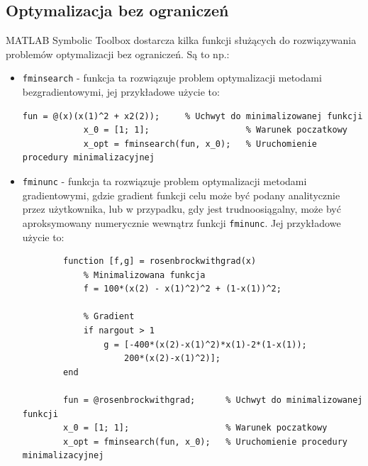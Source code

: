\documentclass{article}
\begin{document}
    \subsection{Optymalizacja bez ograniczeń}
    MATLAB Symbolic Toolbox dostarcza kilka funkcji służących do rozwiązywania problemów optymalizacji bez ograniczeń.
    Są to np.:
    \begin{itemize}
        \item \texttt{fminsearch} - funkcja ta rozwiązuje problem optymalizacji metodami bezgradientowymi,
        jej przykładowe użycie to:
        \begin{lstlisting}[style=Matlab-editor]
            fun = @(x)(x(1)^2 + x2(2));     % Uchwyt do minimalizowanej funkcji
            x_0 = [1; 1];                   % Warunek poczatkowy
            x_opt = fminsearch(fun, x_0);   % Uruchomienie procedury minimalizacyjnej
        \end{lstlisting}
        \item \texttt{fminunc} - funkcja ta rozwiązuje problem optymalizacji metodami gradientowymi, gdzie gradient funkcji celu może być podany analitycznie przez użytkownika, lub w przypadku, gdy jest trudnoosiągalny, może być aproksymowany numerycznie wewnątrz funkcji \texttt{fminunc}.
        Jej przykładowe użycie to:
        \begin{lstlisting}[style=Matlab-editor]
        % Definicja minimalizowanej funkcji - moze zwracac dodatkowo gradient
        function [f,g] = rosenbrockwithgrad(x)
            % Minimalizowana funkcja
            f = 100*(x(2) - x(1)^2)^2 + (1-x(1))^2;

            % Gradient
            if nargout > 1
                g = [-400*(x(2)-x(1)^2)*x(1)-2*(1-x(1));
                    200*(x(2)-x(1)^2)];
        end

        fun = @rosenbrockwithgrad;      % Uchwyt do minimalizowanej funkcji
        x_0 = [1; 1];                   % Warunek poczatkowy
        x_opt = fminsearch(fun, x_0);   % Uruchomienie procedury minimalizacyjnej
    \end{lstlisting}
    \end{itemize}

\end{document}
